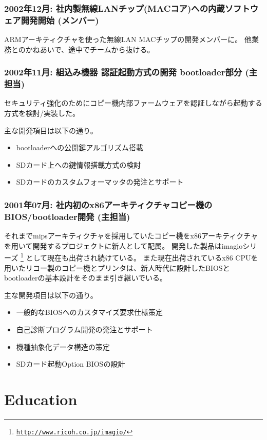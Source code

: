 \documentclass[letterpaper]{article}
\begin{document}
\subsubsection*{2002年12月: 社内製無線LANチップ(MACコア)への内蔵ソフトウェア開発開始 (メンバー)}
ARMアーキティクチャを使った無線LAN MACチップの開発メンバーに。
他業務とのかねあいで、途中でチームから抜ける。

\subsubsection*{2002年11月: 組込み機器 認証起動方式の開発 bootloader部分 (主担当)}
セキュリティ強化のためにコピー機内部ファームウェアを認証しながら起動する方式を検討/実装した。

主な開発項目は以下の通り。
\begin{itemize}
  \item bootloaderへの公開鍵アルゴリズム搭載
  \item SDカード上への鍵情報搭載方式の検討
  \item SDカードのカスタムフォーマッタの発注とサポート
\end{itemize}

\subsubsection*{2001年07月: 社内初のx86アーキティクチャコピー機のBIOS/bootloader開発 (主担当)}
それまでmipsアーキティクチャを採用していたコピー機をx86アーキティクチャを用いて開発するプロジェクトに新人として配属。
開発した製品はimagioシリーズ
\footnote{\href{http://www.ricoh.co.jp/imagio/}{\tt http://www.ricoh.co.jp/imagio/}}
として現在も出荷され続けている。
また現在出荷されているx86 CPUを用いたリコー製のコピー機とプリンタは、新人時代に設計したBIOSとbootloaderの基本設計をそのまま引き継いでいる。

主な開発項目は以下の通り。
\begin{itemize}
  \item 一般的なBIOSへのカスタマイズ要求仕様策定
  \item 自己診断プログラム開発の発注とサポート
  \item 機種抽象化データ構造の策定
  \item SDカード起動Option BIOSの設計
\end{itemize}

\section*{Education}
\end{document}
